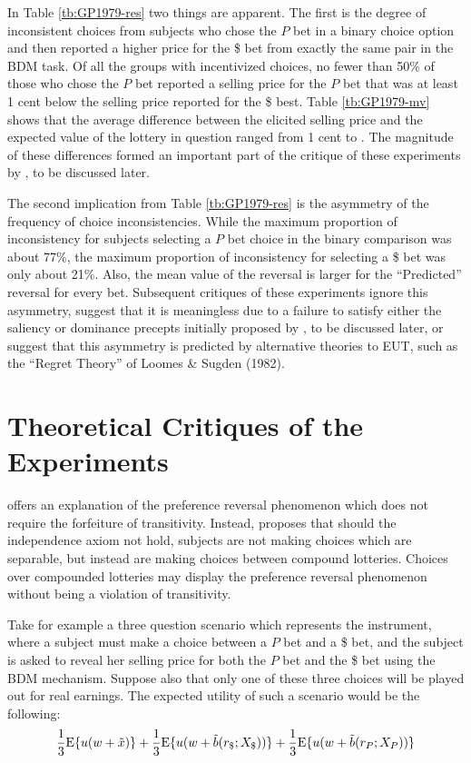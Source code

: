 \documentclass[../main.tex]{subfiles}
\begin{document}
In Table \ref{tb:GP1979-res} two things are apparent.
The first is the degree of inconsistent choices from subjects who chose the $P$ bet in a binary choice option and then reported a higher price for the {\$} bet from exactly the same pair in the BDM task.
Of all the groups with incentivized choices, no fewer than 50\% of those who chose the $P$ bet reported a selling price for the $P$ bet that was at least 1 cent below the selling price reported for the {\$} best.
Table \ref{tb:GP1979-mv} shows that the average difference between the elicited selling price and the expected value of the lottery in question ranged from 1 cent to .
The magnitude of these differences formed an important part of the critique of these experiments by \textcite{Harrison1989, Harrison1992}, to be discussed later.

The second implication from Table \ref{tb:GP1979-res} is the asymmetry of the frequency of choice inconsistencies.
While the maximum proportion of inconsistency for subjects selecting a $P$ bet choice in the binary comparison was about 77\%, the maximum proportion of inconsistency for selecting a {\$} bet was only about 21\%.
Also, the  mean value of the reversal is larger for the \enquote{Predicted} reversal for every bet.
Subsequent critiques of these experiments ignore this asymmetry, suggest that it is meaningless due to a failure to satisfy either the saliency or dominance precepts initially proposed by \textcite{Smith1982}, to be discussed later, or suggest that this asymmetry is predicted by alternative theories to EUT, such as the \enquote{Regret Theory} of  Loomes \& Sugden (1982).

\singlespacing
\section{Theoretical Critiques of the \texorpdfstring{\textcite{Grether1979}}{Grether \& Plott (1979)} Experiments}
\doublespacing

\textcite{Holt1986} offers an explanation of the preference reversal phenomenon which does not require the forfeiture of transitivity.
Instead, \textcite{Holt1986} proposes that should the independence axiom not hold, subjects are not making choices which are separable, but instead are making choices between compound lotteries.
Choices over compounded lotteries may display the preference reversal phenomenon without being a violation of transitivity.

Take for example a three question scenario which represents the \textcite{Grether1979} instrument, where a subject must make a choice between a $P$ bet and a {\$} bet, and the subject is asked to reveal her selling price for both the $P$ bet and the {\$} bet using the BDM mechanism.
Suppose also that only one of these three choices will be played out for real earnings.
The expected utility of such a scenario would be the following:
\begin{equation}
	\label{eq:GP-EU}
	\frac{1}{3}{\operatorname{E}}{\lbrace} u(w+\tilde{x}){\rbrace} + \frac{1}{3}{\operatorname{E}}{\lbrace} u(w+\tilde{b}(r_{\$};X_{\$})){\rbrace} + \frac{1}{3}{\operatorname{E}}{\lbrace} u(w+\tilde{b}(r_P;X_P)){\rbrace}
\end{equation}
\end{document}
